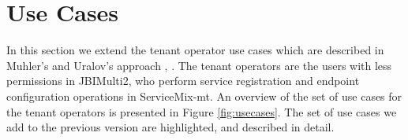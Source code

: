 \newcommand{\usecase}[8]
{
{
\small \begin{longtable}{@{}p{.2\textwidth}p{.01\textwidth}p{.79\textwidth}@{}}
\toprule Name & & \textbf{#1} \\
\midrule Goal & & #2 \\
\midrule Actor & & #3 \\
\midrule Pre-Condition & & #4 \\
\midrule Post-Condition & & #5 \\
\midrule Post-Condition in Special Case & & #6 \\
\midrule Normal Case & \multicolumn{2}{p{.8\textwidth}}{\vspace*{-0.5cm}#7} \\
\midrule Special Cases &  \multicolumn{2}{p{.8\textwidth}}{\vspace*{-0.5cm}#8} \\
\bottomrule
\caption[Description of Use Case: #1]{Description of Use Case \term{#1}.}
\end{longtable}
}
\label{table:#1}
\clearpage
}


\section{Use Cases}
\label{sec:usecases}

In this section we extend the tenant operator use cases which are described in Muhler's and Uralov's approach \cite{Muhler2012}, \cite{Uralov2012}. The tenant operators are the users with less permissions in JBIMulti2, who perform service registration and endpoint configuration operations in ServiceMix-mt. An overview of the set of use cases for the tenant operators is presented in Figure \ref{fig:usecases}. The set of use cases we add to the previous version are highlighted, and described in detail. 

